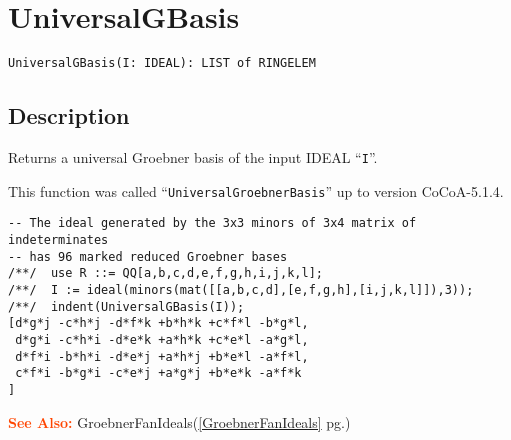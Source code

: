 \documentclass[a4paper]{mybook}
\newenvironment{command}{}{} %
\newcommand\SeeAlso{\par\textcolor{OrangeRed}{\textbf{\large See Also: }}}
\begin{document}
\section{UniversalGBasis}
\label{UniversalGBasis}
\begin{command} %


\begin{Verbatim}[label=syntax, rulecolor=\color{MidnightBlue},
frame=single]
UniversalGBasis(I: IDEAL): LIST of RINGELEM
\end{Verbatim}


\subsection*{Description}

Returns a universal Groebner basis of the input IDEAL ``\verb&I&''.
\par 
This function was called ``\verb&UniversalGroebnerBasis&'' up to
version CoCoA-5.1.4.
\begin{Verbatim}[label=example, rulecolor=\color{PineGreen}, frame=single]
-- The ideal generated by the 3x3 minors of 3x4 matrix of indeterminates
-- has 96 marked reduced Groebner bases
/**/  use R ::= QQ[a,b,c,d,e,f,g,h,i,j,k,l];
/**/  I := ideal(minors(mat([[a,b,c,d],[e,f,g,h],[i,j,k,l]]),3));
/**/  indent(UniversalGBasis(I));
[d*g*j -c*h*j -d*f*k +b*h*k +c*f*l -b*g*l,
 d*g*i -c*h*i -d*e*k +a*h*k +c*e*l -a*g*l,
 d*f*i -b*h*i -d*e*j +a*h*j +b*e*l -a*f*l,
 c*f*i -b*g*i -c*e*j +a*g*j +b*e*k -a*f*k
]
\end{Verbatim}


\SeeAlso %
  GroebnerFanIdeals(\ref{GroebnerFanIdeals} pg.\pageref{GroebnerFanIdeals})
\end{command} %
\end{document}
